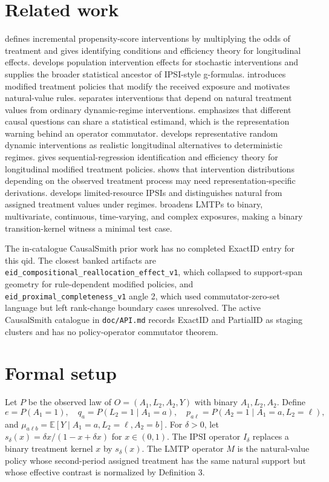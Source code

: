 \documentclass[11pt]{article}
\newcommand{\E}{\mathbb{E}}
\theoremstyle{definition}
\theoremstyle{plain}
\theoremstyle{remark}
\begin{document}
\section{Related work}
\citet{Kennedy2019JASA} defines incremental propensity-score interventions by multiplying the odds of treatment and gives identifying conditions and efficiency theory for longitudinal effects. \citet{DiazVanderLaan2012Biometrics} develops population intervention effects for stochastic interventions and supplies the broader statistical ancestor of IPSI-style g-formulas. \citet{HaneuseRotnitzky2013SIM} introduces modified treatment policies that modify the received exposure and motivates natural-value rules. \citet{YoungHernanRobins2014EM} separates interventions that depend on natural treatment values from ordinary dynamic-regime interventions. \citet{VanderLaanLuedtkeDiaz2014EM} emphasizes that different causal questions can share a statistical estimand, which is the representation warning behind an operator commutator. \citet{YoungLoganRobinsHernan2019JASA} develops representative random dynamic interventions as realistic longitudinal alternatives to deterministic regimes. \citet{DiazWilliamsHoffmanSchenck2023JASA} gives sequential-regression identification and efficiency theory for longitudinal modified treatment policies. \citet{WenMarcusYoung2023SMMR} shows that intervention distributions depending on the observed treatment process may need representation-specific derivations. \citet{SarvetWanisYoungHernandezAlejandroStensrud2023Biometrics} develops limited-resource IPSIs and distinguishes natural from assigned treatment values under regimes. \citet{HoffmanSalazarBarretoWilliamsRudolphDiaz2024Epidemiology} broadens LMTPs to binary, multivariate, continuous, time-varying, and complex exposures, making a binary transition-kernel witness a minimal test case.

The in-catalogue CausalSmith prior work has no completed ExactID entry for this qid. The closest banked artifacts are \texttt{eid\_compositional\_reallocation\_effect\_v1}, which collapsed to support-span geometry for rule-dependent modified policies, and \texttt{eid\_proximal\_completeness\_v1} angle 2, which used commutator-zero-set language but left rank-change boundary cases unresolved. The active CausalSmith catalogue in \texttt{doc/API.md} records ExactID and PartialID as staging clusters and has no policy-operator commutator theorem.

\section{Formal setup}
Let $P$ be the observed law of $O=(A_1,L_2,A_2,Y)$ with binary $A_1,L_2,A_2$. Define
\[
e=P(A_1=1),\quad q_a=P(L_2=1\mid A_1=a),\quad p_{a\ell}=P(A_2=1\mid A_1=a,L_2=\ell),
\]
and $\mu_{a\ell b}=\E[Y\mid A_1=a,L_2=\ell,A_2=b]$. For $\delta>0$, let $s_\delta(x)=\delta x/(1-x+\delta x)$ for $x\in(0,1)$. The IPSI operator $I_\delta$ replaces a binary treatment kernel $x$ by $s_\delta(x)$. The LMTP operator $M$ is the natural-value policy whose second-period assigned treatment has the same natural support but whose effective contrast is normalized by Definition 3.
\end{document}
